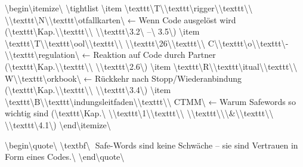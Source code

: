 \textbackslash{}begin\textbackslash{}{itemize\textbackslash{}}
\textbackslash{}tightlist
\textbackslash{}item
  \textbackslash{}texttt\textbackslash{}{T\textbackslash{}}\textbackslash{}texttt\textbackslash{}{rigger\textbackslash{}}\textbackslash{}texttt\textbackslash{}{\textbackslash{} \textbackslash{}}\textbackslash{}texttt\textbackslash{}{N\textbackslash{}}\textbackslash{}texttt\textbackslash{}{otfallkarten\textbackslash{}} ← Wenn Code ausgelöst wird (\textbackslash{}texttt\textbackslash{}{Kap.\textbackslash{}}\textbackslash{}texttt\textbackslash{}{\textbackslash{} \textbackslash{}}\textbackslash{}texttt\textbackslash{}{3.2\textbackslash{} –\textbackslash{} 3.5\textbackslash{}})
\textbackslash{}item
  \textbackslash{}texttt\textbackslash{}{T\textbackslash{}}\textbackslash{}texttt\textbackslash{}{ool\textbackslash{}}\textbackslash{}texttt\textbackslash{}{\textbackslash{} \textbackslash{}}\textbackslash{}texttt\textbackslash{}{26\textbackslash{}}\textbackslash{}texttt\textbackslash{}{\textbackslash{} C\textbackslash{}}\textbackslash{}texttt\textbackslash{}{o\textbackslash{}}\textbackslash{}texttt\textbackslash{}{-\textbackslash{}}\textbackslash{}texttt\textbackslash{}{regulation\textbackslash{}} ← Reaktion auf Code durch Partner (\textbackslash{}texttt\textbackslash{}{Kap.\textbackslash{}}\textbackslash{}texttt\textbackslash{}{\textbackslash{} \textbackslash{}}\textbackslash{}texttt\textbackslash{}{2.6\textbackslash{}})
\textbackslash{}item
  \textbackslash{}texttt\textbackslash{}{R\textbackslash{}}\textbackslash{}texttt\textbackslash{}{itual\textbackslash{}}\textbackslash{}texttt\textbackslash{}{\textbackslash{} W\textbackslash{}}\textbackslash{}texttt\textbackslash{}{orkbook\textbackslash{}} ← Rückkehr nach Stopp/Wiederanbindung (\textbackslash{}texttt\textbackslash{}{Kap.\textbackslash{}}\textbackslash{}texttt\textbackslash{}{\textbackslash{} \textbackslash{}}\textbackslash{}texttt\textbackslash{}{3.4\textbackslash{}})
\textbackslash{}item
  \textbackslash{}texttt\textbackslash{}{B\textbackslash{}}\textbackslash{}texttt\textbackslash{}{indungsleitfaden\textbackslash{}}\textbackslash{}texttt\textbackslash{}{\textbackslash{} CTMM\textbackslash{}} ← Warum Safewords so wichtig sind (\textbackslash{}texttt\textbackslash{}{Kap.\textbackslash{} \textbackslash{}}\textbackslash{}texttt\textbackslash{}{1\textbackslash{}}\textbackslash{}texttt\textbackslash{}{\textbackslash{} \textbackslash{}}\textbackslash{}texttt\textbackslash{}{\textbackslash{}\textbackslash{}&\textbackslash{}}\textbackslash{}texttt\textbackslash{}{\textbackslash{} \textbackslash{}}\textbackslash{}texttt\textbackslash{}{4.1\textbackslash{}})
\textbackslash{}end\textbackslash{}{itemize\textbackslash{}}

\textbackslash{}begin\textbackslash{}{quote\textbackslash{}}
\textbackslash{}textbf\textbackslash{}{📎 Safe-Words sind keine Schwäche -- sie sind Vertrauen in Form eines Codes.\textbackslash{}}
\textbackslash{}end\textbackslash{}{quote\textbackslash{}}
